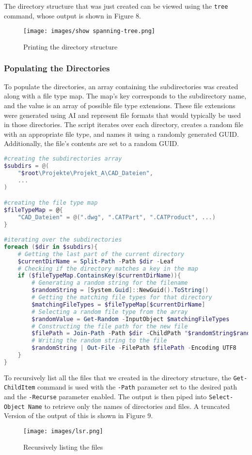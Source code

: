 \documentclass[a4paper]{article}
\newcommand{\abc}{\hfill \break}
\begin{document}
\newpage
The directory structure that was just created can be viewed using the \texttt{tree} command, whose output is shown in Figure 8.
\begin{figure}[h]
	\texttt{[image: images/show spanning-tree.png]}
	\centering
	\caption{Printing the directory structure}
	\label{fig:tree}
\end{figure}
\newpage
\subsubsection{Populating the Directories}
To populate the directories, an array containing the subdirectories was created along with a file type map. The map's key corresponds to the subdirectory name, and the value is an array of possible file type extensions. These file extensions were generated using AI and represent file formats that would typically be used in those directories.\abc
The script iterates over each directory, creates a random file with an appropriate file type, and names it using a randomly generated GUID. Additionally, the file's contents are set to a random GUID.\abc
\begin{lstlisting}[language=PowerShell]
#creating the subdirectories array
$subdirs = @(
    "$root\Projekte\Projekt_A\CAD_Dateien",
    ...
)

#creating the file type map
$fileTypeMap = @{
    "CAD_Dateien" = @(".dwg", ".CATPart", ".CATProduct", ...)
}

#iterating over the subdirectories
foreach ($dir in $subdirs){
    # Getting the last part of the current directory
    $currentDirName = Split-Path -Path $dir -Leaf
    # Checking if the directory matches a key in the map
    if ($fileTypeMap.ContainsKey($currentDirName)){
        # Generating a random string for the filename
        $randomString = [System.Guid]::NewGuid().ToString()
        # Getting the matching file types for that directory
        $matchingFileTypes = $fileTypeMap[$currentDirName]
        # Selecting a random file type from the array
        $randomValue = Get-Random -InputObject $matchingFileTypes
        # Constructing the file path for the new file
        $filePath = Join-Path -Path $dir -ChildPath "$randomString$randomValue"
        # Writing the random string to the file
        $randomString | Out-File -FilePath $filePath -Encoding UTF8
    }
}
\end{lstlisting}
To recursively list all the files that we created in the directory structure, the \texttt{Get-ChildItem} command is used with the \texttt{-Path} parameter set to the desired path and the \texttt{-Recurse} parameter enabled. The output is then piped into \texttt{Select-Object Name} to retrieve only the names of directories and files. A truncated Version of the output of this is shown in Figure 9.
\begin{figure}[h]
	\texttt{[image: images/lsr.png]}
	\centering
	\caption{Recursively listing the files}
\end{figure}
\newpage
\end{document}
